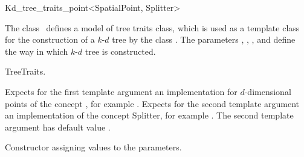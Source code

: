 

\begin{ccRefClass}{Kd_tree_traits_point<SpatialPoint, Splitter>}  %


\ccDefinition
  
The class \ccRefName\ defines a model of tree traits class, which is used as
a template class for the construction of a $k$-$d$ tree by the class .
The parameters , , , and   
define the way in which $k$-$d$ tree is constructed.



\ccIsModel

TreeTraits.

\ccParameters

Expects for the first template argument
an implementation for
$d$-dimensional points of
the concept , 
for example .
Expects for the second template argument an implementation of the concept {Splitter}, 
for example .
The second template argument has default value .

\ccTypes


\ccCreation
{}  %



{Constructor assigning values to the parameters.}


\end{ccRefClass}
